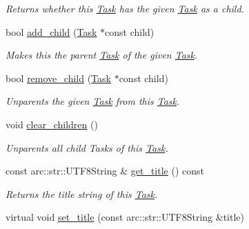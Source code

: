 \begin{DoxyCompactItemize}
\begin{DoxyCompactList}\small\item\em Returns whether this \hyperlink{classsigma_1_1core_1_1tasks_1_1_task}{Task} has the given \hyperlink{classsigma_1_1core_1_1tasks_1_1_task}{Task} as a child. \end{DoxyCompactList}\item 
bool \hyperlink{classsigma_1_1core_1_1tasks_1_1_task_abac88c4ddaf54ae20aab497e95023f9e}{add\+\_\+child} (\hyperlink{classsigma_1_1core_1_1tasks_1_1_task}{Task} $\ast$const child)
\begin{DoxyCompactList}\small\item\em Makes this the parent \hyperlink{classsigma_1_1core_1_1tasks_1_1_task}{Task} of the given \hyperlink{classsigma_1_1core_1_1tasks_1_1_task}{Task}. \end{DoxyCompactList}\item 
bool \hyperlink{classsigma_1_1core_1_1tasks_1_1_task_a9df7e8a262b51b440cc6a45dbe219810}{remove\+\_\+child} (\hyperlink{classsigma_1_1core_1_1tasks_1_1_task}{Task} $\ast$const child)
\begin{DoxyCompactList}\small\item\em Unparents the given \hyperlink{classsigma_1_1core_1_1tasks_1_1_task}{Task} from this \hyperlink{classsigma_1_1core_1_1tasks_1_1_task}{Task}. \end{DoxyCompactList}\item 
void \hyperlink{classsigma_1_1core_1_1tasks_1_1_task_acb08acc571c5e0678d27d52a18a7db5e}{clear\+\_\+children} ()
\begin{DoxyCompactList}\small\item\em Unparents all child Tasks of this \hyperlink{classsigma_1_1core_1_1tasks_1_1_task}{Task}. \end{DoxyCompactList}\item 
\hypertarget{classsigma_1_1core_1_1tasks_1_1_task_a96211028a099261a5f044462343c6089}{}const arc\+::str\+::\+U\+T\+F8\+String \& \hyperlink{classsigma_1_1core_1_1tasks_1_1_task_a96211028a099261a5f044462343c6089}{get\+\_\+title} () const \label{classsigma_1_1core_1_1tasks_1_1_task_a96211028a099261a5f044462343c6089}

\begin{DoxyCompactList}\small\item\em Returns the title string of this \hyperlink{classsigma_1_1core_1_1tasks_1_1_task}{Task}. \end{DoxyCompactList}\item 
\hypertarget{classsigma_1_1core_1_1tasks_1_1_task_af609f0eab85e4291630c4d71e393cef1}{}virtual void \hyperlink{classsigma_1_1core_1_1tasks_1_1_task_af609f0eab85e4291630c4d71e393cef1}{set\+\_\+title} (const arc\+::str\+::\+U\+T\+F8\+String \&title)\label{classsigma_1_1core_1_1tasks_1_1_task_af609f0eab85e4291630c4d71e393cef1}


\end{DoxyCompactItemize}
